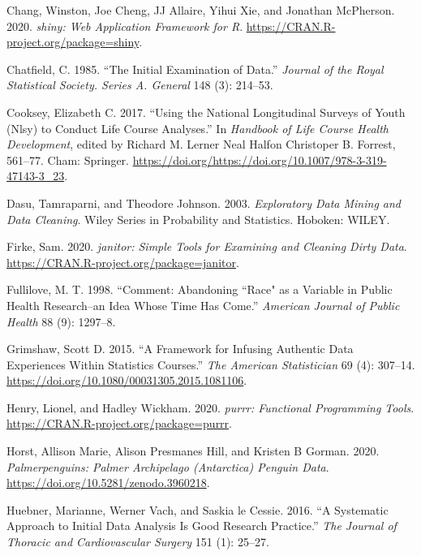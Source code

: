 \documentclass[12pt]{article}
\begin{document}
\leavevmode\hypertarget{ref-shiny}{}%
Chang, Winston, Joe Cheng, JJ Allaire, Yihui Xie, and Jonathan McPherson. 2020. \emph{shiny: Web Application Framework for R}. \url{https://CRAN.R-project.org/package=shiny}.

\leavevmode\hypertarget{ref-Chatfield1985TIEo}{}%
Chatfield, C. 1985. ``The Initial Examination of Data.'' \emph{Journal of the Royal Statistical Society. Series A. General} 148 (3): 214--53.

\leavevmode\hypertarget{ref-eliznlsy}{}%
Cooksey, Elizabeth C. 2017. ``Using the National Longitudinal Surveys of Youth (Nlsy) to Conduct Life Course Analyses.'' In \emph{Handbook of Life Course Health Development}, edited by Richard M. Lerner Neal Halfon Christoper B. Forrest, 561--77. Cham: Springer. \url{https://doi.org/https://doi.org/10.1007/978-3-319-47143-3_23}.

\leavevmode\hypertarget{ref-DasuTamraparni2003Edma}{}%
Dasu, Tamraparni, and Theodore Johnson. 2003. \emph{Exploratory Data Mining and Data Cleaning}. Wiley Series in Probability and Statistics. Hoboken: WILEY.

\leavevmode\hypertarget{ref-janitor}{}%
Firke, Sam. 2020. \emph{janitor: Simple Tools for Examining and Cleaning Dirty Data}. \url{https://CRAN.R-project.org/package=janitor}.

\leavevmode\hypertarget{ref-racismnotrace}{}%
Fullilove, M. T. 1998. ``Comment: Abandoning ``Race" as a Variable in Public Health Research--an Idea Whose Time Has Come.'' \emph{American Journal of Public Health} 88 (9): 1297--8.

\leavevmode\hypertarget{ref-grimshaw}{}%
Grimshaw, Scott D. 2015. ``A Framework for Infusing Authentic Data Experiences Within Statistics Courses.'' \emph{The American Statistician} 69 (4): 307--14. \url{https://doi.org/10.1080/00031305.2015.1081106}.

\leavevmode\hypertarget{ref-purrr}{}%
Henry, Lionel, and Hadley Wickham. 2020. \emph{purrr: Functional Programming Tools}. \url{https://CRAN.R-project.org/package=purrr}.

\leavevmode\hypertarget{ref-penguins-data}{}%
Horst, Allison Marie, Alison Presmanes Hill, and Kristen B Gorman. 2020. \emph{Palmerpenguins: Palmer Archipelago (Antarctica) Penguin Data}. \url{https://doi.org/10.5281/zenodo.3960218}.

\leavevmode\hypertarget{ref-HuebnerMariannePhD2016Asat}{}%
Huebner, Marianne, Werner Vach, and Saskia le Cessie. 2016. ``A Systematic Approach to Initial Data Analysis Is Good Research Practice.'' \emph{The Journal of Thoracic and Cardiovascular Surgery} 151 (1): 25--27.
\end{document}
